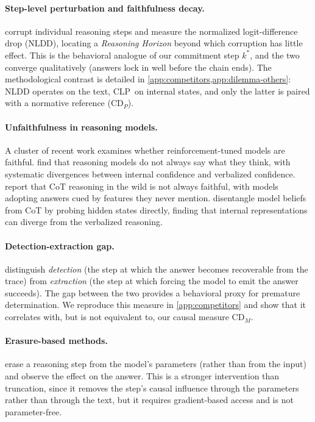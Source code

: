 \documentclass[11pt]{article}
\newcommand{\CDP}{\mathrm{CD}_{P}}
\newcommand{\CDM}{\mathrm{CD}_{M}}
\newcommand{\stepk}{k}
\newcommand{\CLP}{\textsc{CLP}}
\begin{document}
\paragraph{Step-level perturbation and faithfulness decay.}
\citet{DBLP:journals/corr/abs-2602-11201} corrupt individual reasoning steps
and measure the normalized logit-difference drop (NLDD), locating a
\emph{Reasoning Horizon} beyond which corruption has little effect. This is the
behavioral analogue of our commitment step $\stepk^{*}$, and the two converge
qualitatively (answers lock in well before the chain ends). The methodological
contrast is detailed in \cref{app:competitors,app:dilemma-others}: NLDD operates
on the text, \CLP\ on internal states, and only the latter is paired with a
normative reference ($\CDP$).

\paragraph{Unfaithfulness in reasoning models.}
A cluster of recent work examines whether reinforcement-tuned models are
faithful. \citet{DBLP:journals/corr/abs-2505-05410} find that reasoning models
do not always say what they think, with systematic divergences between internal
confidence and verbalized confidence. \citet{DBLP:journals/corr/abs-2503-08679}
report that CoT reasoning in the wild is not always faithful, with
models adopting answers cued by features they never mention.
\citet{DBLP:journals/corr/abs-2603-05488} disentangle model beliefs from
CoT by probing hidden states directly, finding that internal
representations can diverge from the verbalized reasoning.

\paragraph{Detection-extraction gap.}
\citet{DBLP:journals/corr/abs-2604-06613} distinguish \emph{detection} (the
step at which the answer becomes recoverable from the trace) from
\emph{extraction} (the step at which forcing the model to emit the answer
succeeds). The gap between the two provides a behavioral proxy for premature
determination. We reproduce this measure in \cref{app:competitors} and show that
it correlates with, but is not equivalent to, our causal measure $\CDM$.

\paragraph{Erasure-based methods.}
\citet{DBLP:conf/emnlp/TutekCMB25} erase a reasoning step from the model's
parameters (rather than from the input) and observe the effect on the answer.
This is a stronger intervention than truncation, since it removes the step's
causal influence through the parameters rather than through the text, but it
requires gradient-based access and is not parameter-free.
\end{document}
